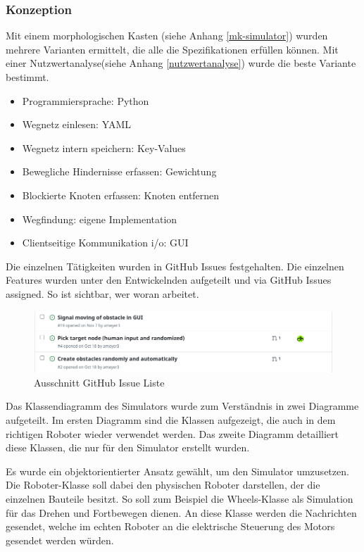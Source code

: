 \subsubsection{Konzeption}

Mit einem morphologischen Kasten (siehe Anhang \ref{mk-simulator}) wurden mehrere Varianten ermittelt, die alle die Spezifikationen erfüllen können. Mit einer Nutzwertanalyse(siehe Anhang \ref{nutzwertanalyse}) wurde die beste Variante bestimmt.

\begin{itemize}
    \item Programmiersprache: Python
    \item Wegnetz einlesen: YAML
    \item Wegnetz intern speichern: Key-Values
    \item Bewegliche Hindernisse erfassen: Gewichtung
    \item Blockierte Knoten erfassen: Knoten entfernen
    \item Wegfindung: eigene Implementation
    \item Clientseitige Kommunikation \acrshort{i/o}: GUI
\end{itemize}

Die einzelnen Tätigkeiten wurden in GitHub Issues festgehalten. Die einzelnen Features wurden unter den Entwickelnden aufgeteilt und via GitHub Issues assigned. So ist sichtbar, wer woran arbeitet.

\begin{figure}[H]
\centering
\includegraphics[width=\textwidth]{img/github-issues.png}
\caption{Ausschnitt GitHub Issue Liste}
\label{fig:github-issues}
\end{figure}

Das Klassendiagramm des Simulators wurde zum Verständnis in zwei Diagramme aufgeteilt. Im ersten Diagramm sind die Klassen aufgezeigt, die auch in dem richtigen Roboter wieder verwendet werden. Das zweite Diagramm detailliert diese Klassen, die nur für den Simulator erstellt wurden.

Es wurde ein objektorientierter Ansatz gewählt, um den Simulator umzusetzen. Die Roboter-Klasse soll dabei den physischen Roboter darstellen, der die einzelnen Bauteile besitzt. So soll zum Beispiel die Wheels-Klasse als Simulation für das Drehen und Fortbewegen dienen. An diese Klasse werden die Nachrichten gesendet, welche im echten Roboter an die elektrische Steuerung des Motors gesendet werden würden.

